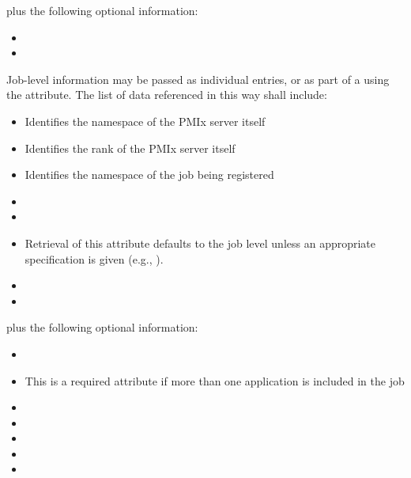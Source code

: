 plus the following optional information:

\begin{itemize}
    \item {}
    \item {}
\end{itemize}

Job-level information may be passed as individual  entries, or as part of a  using the  attribute. The list of data referenced in this way shall include:

\begin{itemize}
    \item {}Identifies the namespace of the \ac{PMIx} server itself
    \pasteAttributeItemEnd
    \item {}Identifies the rank of the \ac{PMIx} server itself
    \pasteAttributeItemEnd
    \item {}Identifies the namespace of the job being registered
    \pasteAttributeItemEnd
    \item {}
    \item {}
    \item {}Retrieval of this attribute defaults to the job level unless an appropriate specification is given (e.g., ).
    \pasteAttributeItemEnd
    \item {}
    \item {}
\end{itemize}

plus the following optional information:

\begin{itemize}
    \item {}
    \item {}This is a required attribute if more than one application is included in the job
    \pasteAttributeItemEnd
    \item {}
    \item {}
    \item {}
    \item {}
    \item {}
\end{itemize}

